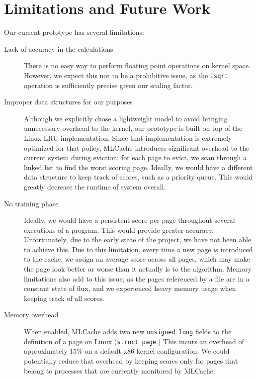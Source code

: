 \section{Limitations and Future Work}
Our current prototype has several limitations:

\begin{description}
  \item[Lack of accuracy in the calculations] There is no easy way to perform
    floating point operations on kernel space. However, we expect this not to
    be a prohibitive issue, as the \texttt{isqrt} operation is sufficiently
    precise given our scaling factor.

  \item[Improper data structures for our purposes] Although we explicitly chose
    a lightweight model to avoid bringing unnecessary overhead to the kernel,
    our prototype is built on top of the Linux LRU implementation. Since that
    implementation is extremely optimized for that policy, MLCache introduces
    significant overhead to the current system during eviction: for each page
    to evict, we scan through a linked list to find the worst scoring page.
    Ideally, we would have a different data structure to keep track of scores,
    such as a priority queue. This would greatly decrease the runtime of system
    overall.

  \item[No training phase] Ideally, we would have a persistent score per page
    throughout several executions of a program. This would provide greater
    accuracy. Unfortunately, due to the early state of the project, we have not
    been able to achieve this. Due to this limitation, every time a new page is
    introduced to the cache, we assign an average score across all pages, which
    may make the page look better or worse than it actually is to the
    algorithm. Memory limitations also add to this issue, as the pages
    referenced by a file are in a constant state of flux, and we
    experienced heavy memory usage when keeping track of all scores.

  \item[Memory overhead] When enabled, MLCache adds two new \texttt{unsigned long}
    fields to the definition of a page on Linux (\texttt{struct page}.) This
    incurs an overhead of approximately 15\% on a default x86 kernel configuration.
    We could potentially reduce that overhead by keeping scores only for pages
    that belong to processes that are currently monitored by MLCache.

\end{description}

